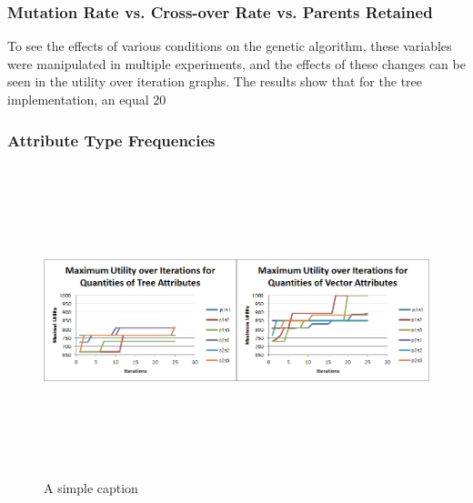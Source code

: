 \documentclass{acm_proc_article-sp}
\begin{document}
    \subsubsection{Mutation Rate vs. Cross-over Rate vs. Parents Retained}

To see the effects of various conditions on the genetic algorithm, these variables were manipulated in multiple experiments, and the effects of these changes can be seen in the utility over iteration graphs. The results show that for the tree implementation, an equal 20%

    \subsubsection{Attribute Type Frequencies}

\begin{figure}[ht!]
\centering
\includegraphics[width=\textwidth,height=90mm,keepaspectratio]{./images/attr_frquency_comparison.png}
\caption{A simple caption}
\label{attribute_frequency_experiments}
\end{figure}
\end{document}
